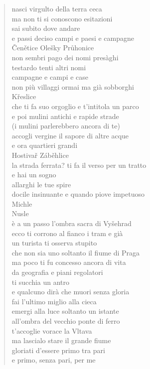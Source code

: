 \clearpage


\begin{verse}
    nasci virgulto della terra ceca\\
    ma non ti si conoscono esitazioni\\
    sai subito dove andare\\
    e passi deciso campi e paesi e campagne\\
    Čenětice Olešky Průhonice\\
    non sembri pago dei nomi presàghi \\
    testardo tenti altri nomi\\
    campagne e campi e case\\
    non più villaggi ormai ma già sobborghi\\
    Křeslice\\
    che ti fa suo orgoglio e t'intitola un parco\\
    e poi mulini antichi e rapide strade\\
    (i mulini parlerebbero ancora di te)\\
    accogli vergine il sapore di altre acque\\
    e ora quartieri grandi\\
    Hostivař Záběhlice\\
    la strada ferrata? ti fa il verso per un tratto\\
    e hai un sogno\\
    allarghi le tue spire\\
    docile insinuante e quando piove impetuoso\\
    Michle\\
    Nusle\\
    è a un passo l'ombra sacra di Vyšehrad\\
    ecco ti corrono al fianco i tram e già\\
    un turista ti osserva stupito\\
    che non sia uno soltanto il fiume di Praga\\
    ma poco ti fu concesso ancora di vita\\
    da geografia e piani regolatori\\
    ti succhia un antro\\
    e qualcuno dirà che muori senza gloria\\
    fai l'ultimo miglio alla cieca\\
    emergi alla luce soltanto un istante\\
    all'ombra del vecchio ponte di ferro\\
    t'accoglie vorace la Vltava\\
    ma lascialo stare il grande fiume \\
    gloriati d'essere primo tra pari\\
    e primo, senza pari, per me
\end{verse}

